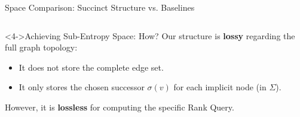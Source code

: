 \begin{frame}{Space Comparison: Succinct Structure vs. Baselines}
\begin{columns}[c]
\begin{column}{0.5\textwidth}
            \begin{alertblock}<4->{Achieving Sub-Entropy Space: How?}
                Our structure is \textbf{lossy} regarding the full graph topology:
                \begin{itemize}
                    \item It \alert{does not store} the complete edge set.
                    \item It only stores the chosen successor $\sigma(v)$ for each implicit node (in $\Sigma$).
                \end{itemize}
                However, it is \textbf{lossless} for computing the specific \alert{Rank Query}.
            \end{alertblock}
        \end{column}
    \end{columns}
\end{frame}
